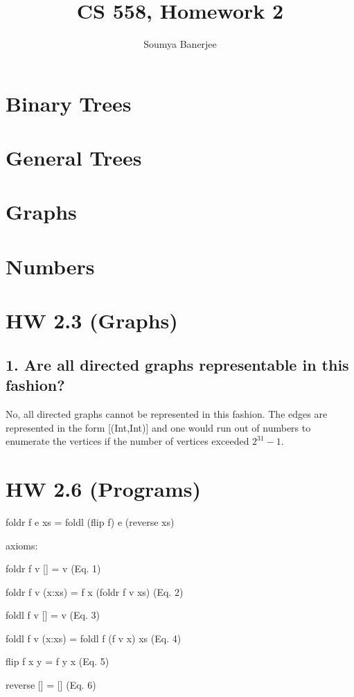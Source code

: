 \documentclass[12pt]{article}
\title{CS 558, Homework 2}
\author{Soumya Banerjee}
\begin{document}
\maketitle

\clearpage
\newpage 

\section{Binary Trees}

\section{General Trees}

\section{Graphs}

\section{Numbers}


\section{HW 2.3 (Graphs)}
\subsection{1. Are all directed graphs representable in this fashion?}

No, all directed graphs cannot be represented in this fashion. The edges are represented in the form [(Int,Int)] and one would run out of numbers to enumerate the vertices if the number of vertices exceeded $2^{31} - 1$.

\section{HW 2.6 (Programs)}


foldr f e xs = foldl (flip f) e (reverse xs)

axioms:


foldr f v [] = v					 (Eq. 1)

foldr f v (x:xs) = f x (foldr f v xs)		 (Eq. 2)

foldl f v [] = v					 (Eq. 3)

foldl f v (x:xs) = foldl f (f v x) xs		 (Eq. 4)


flip f x y = f y x					 (Eq. 5)

reverse [] = []					 (Eq. 6)
\end{document}
